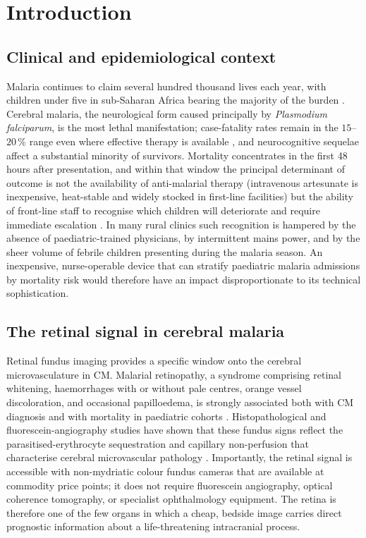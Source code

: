 \documentclass[twocolumn,10pt]{article}
\begin{document}
\section{Introduction}
\label{sec:intro}

\subsection{Clinical and epidemiological context}
Malaria continues to claim several hundred thousand lives each
year, with children under five in sub-Saharan Africa bearing the
majority of the burden \cite{WHO2022,WHO2023}. Cerebral malaria,
the neurological form caused principally by
\textit{Plasmodium falciparum}, is the most lethal manifestation;
case-fatality rates remain in the $15$--$20\,\%$ range even where
effective therapy is available \cite{Idro2010,Taylor2004}, and
neurocognitive sequelae affect a substantial minority of survivors.
Mortality concentrates in the first 48\,hours after presentation,
and within that window the principal determinant of outcome is not
the availability of anti-malarial therapy (intravenous artesunate
is inexpensive, heat-stable and widely stocked in first-line
facilities) but the ability of front-line staff to recognise which
children will deteriorate and require immediate escalation
\cite{Dondorp2010}. In many rural clinics such recognition is
hampered by the absence of paediatric-trained physicians, by
intermittent mains power, and by the sheer volume of febrile
children presenting during the malaria season. An inexpensive,
nurse-operable device that can stratify paediatric malaria
admissions by mortality risk would therefore have an impact
disproportionate to its technical sophistication.

\subsection{The retinal signal in cerebral malaria}
Retinal fundus imaging provides a specific window onto the
cerebral microvasculature in CM. Malarial retinopathy, a syndrome
comprising retinal whitening, haemorrhages with or without pale
centres, orange vessel discoloration, and occasional papilloedema,
is strongly associated both with CM diagnosis and with mortality
in paediatric cohorts
\cite{Beare2006,Beare2009,BeareArch2004,BeareEye2023,Wilson2023}.
Histopathological and fluorescein-angiography studies have shown
that these fundus signs reflect the parasitised-erythrocyte
sequestration and capillary non-perfusion that characterise
cerebral microvascular pathology \cite{Barrera2018,MacCormick2020}.
Importantly, the retinal signal is accessible with
non-mydriatic colour fundus cameras that are available at
commodity price points; it does not require fluorescein
angiography, optical coherence tomography, or specialist
ophthalmology equipment. The retina is therefore one of the few
organs in which a cheap, bedside image carries direct prognostic
information about a life-threatening intracranial process.
\end{document}
